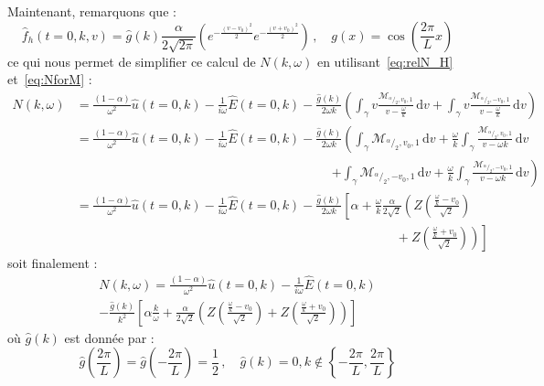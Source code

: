 Maintenant, remarquons que :
$$
  \hat{f}_h(t=0,k,v) = \hat{g}(k)\frac{\alpha}{2\sqrt{2\pi}}\left( e^{-\frac{(v-v_0)^2}{2}}  e^{-\frac{(v+v_0)^2}{2}}\right)\,,\quad g(x) = \cos\left(\frac{2\pi}{L}x\right)
$$
ce qui nous permet de simplifier ce calcul de $N(k,\omega)$ en utilisant~\eqref{eq:relN_H} et~\eqref{eq:NforM} :
$$
  \begin{aligned}
    N(k,\omega)
      & = \frac{(1-\alpha)}{\omega^2}\hat{u}(t=0,k) - \frac{1}{i\omega}\hat{E}(t=0,k) - \frac{\hat{g}(k)}{2\omega k}\left( \int_\gamma v\frac{\mathcal{M}_{^\alpha/_2,v_0,1}}{v-\frac{\omega}{k}}\,\mathrm{d}v  +  \int_\gamma v\frac{\mathcal{M}_{^\alpha/_2,-v_0,1}}{v-\frac{\omega}{k}}\,\mathrm{d}v \right) \\
      & = \frac{(1-\alpha)}{\omega^2}\hat{u}(t=0,k) - \frac{1}{i\omega}\hat{E}(t=0,k) - \frac{\hat{g}(k)}{2\omega k}\left( \int_\gamma\mathcal{M}_{^\alpha/_2,v_0,1}\,\mathrm{d}v + \frac{\omega}{k}\int_\gamma \frac{\mathcal{M}_{^\alpha/_2,v_0,1}}{v-\omega{k}}\,\mathrm{d}v\right. \\
      & \qquad\qquad\qquad\qquad\qquad\qquad\qquad\qquad\qquad\qquad \left. + \int_\gamma\mathcal{M}_{^\alpha/_2,-v_0,1}\,\mathrm{d}v + \frac{\omega}{k}\int_\gamma \frac{\mathcal{M}_{^\alpha/_2,-v_0,1}}{v-\omega{k}}\,\mathrm{d}v \right) \\
      & = \frac{(1-\alpha)}{\omega^2}\hat{u}(t=0,k) - \frac{1}{i\omega}\hat{E}(t=0,k) - \frac{\hat{g}(k)}{2\omega k}\left[ \alpha + \frac{\omega}{k}\frac{\alpha}{2\sqrt{2}}\left( Z\left(\frac{\frac{\omega}{k}-v_0}{\sqrt{2}}\right) \right.\right. \\
      & \qquad\qquad\qquad\qquad\qquad\qquad\qquad\qquad\qquad\qquad\qquad\qquad\quad + \left.\left.Z\left(\frac{\frac{\omega}{k}+v_0}{\sqrt{2}}\right) \right)\right]
  \end{aligned}
$$
soit finalement :
\begin{equation}
  \begin{split}
    N(k,\omega) = \frac{(1-\alpha)}{\omega^2}\hat{u}(t=0,k) - \frac{1}{i\omega}\hat{E}(t=0,k) \\
      -\frac{\hat{g}(k)}{k^2}\left[ \alpha\frac{k}{\omega} + \frac{\alpha}{2\sqrt{2}}\left( Z\left(\frac{\frac{\omega}{k}-v_0}{\sqrt{2}}\right) + Z\left(\frac{\frac{\omega}{k}+v_0}{\sqrt{2}}\right) \right) \right]
  \end{split}
  \label{eq:N_hchyb}
\end{equation}
où $\hat{g}(k)$ est donnée par :
\begin{equation}
  \hat{g}\left(\frac{2\pi}{L}\right) = \hat{g}\left(-\frac{2\pi}{L}\right) = \frac{1}{2}\,,\quad \hat{g}(k) = 0, k\notin\left\{-\frac{2\pi}{L} ,\frac{2\pi}{L} \right\}
\label{eq:gk}
\end{equation}

